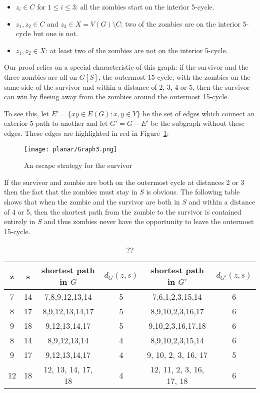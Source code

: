 \begin{itemize}
\item $z_i \in C$ for $1 \leq i \leq 3$: all the zombies start on the interior 5-cycle.
\item $z_1, z_2 \in C$ and $z_3 \in X = V(G) \setminus C$: two of the zombies are on the interior 5-cycle but one is not.
\item $z_1, z_2 \in X$: at least two of the zombies are not on the interior 5-cycle.
\end{itemize}

Our proof relies on a special characteristic of this graph: if the survivor and the three zombies are all on $G[S]$, the outermost 15-cycle,  with
the zombies on the same side of the survivor and within a distance of 2, 3, 4 or 5, then the survivor can win by fleeing away from the zombies around the outermost 15-cycle.

To see this, let $E' = \{xy \in E(G) : x, y \in Y\}$ be the set of edges which connect an exterior 5-path to another and let $G' = G - E'$ be the subgraph without these edges.
These edges are highlighted in red in Figure~\ref{fig:planarG3}:

\begin{figure}
\centering
\texttt{[image: planar/Graph3.png]}
\caption{An escape strategy for the survivor\label{fig:planarG3}}
\end{figure}

If the survivor and zombie are both on the outermost cycle at distances 2 or 3 then
the fact that the zombies must stay in $S$ is obvious.
The following table shows that when the zombie and the survivor are both in $S$ and within a distance of 4 or 5, then the shortest path from the zombie to the survivor is contained entirely in $S$ and thus zombies never have the opportunity to leave the outermost 15-cycle.

\begin{table}
\centering
\begin{tabular}{c | c | c | c | c | c}
z & s & shortest path in $G$ & $d_{G}(z,s)$ & shortest path in $G'$ & $d_{G'}(z,s)$  \\
\hline
7 & 14 & 7,8,9,12,13,14 & 5 & 7,6,1,2,3,15,14 & 6 \\
8 & 17 & 8,9,12,13,14,17 & 5 & 8,9,10,2,3,16,17 & 6 \\
9 & 18 & 9,12,13,14,17 & 5 & 9,10,2,3,16,17,18 & 6 \\
\hline
8 & 14 & 8,9,12,13,14 & 4 & 8,9,10,2,3,15,14 & 6 \\
9 & 17 & 9,12,13,14,17 & 4 & 9, 10, 2, 3, 16, 17 & 5 \\
12 & 18 & 12, 13, 14, 17, 18 & 4 & 12, 11, 2, 3, 16, 17, 18 & 6
\end{tabular}
\caption{?? \label{table outside}}
\end{table}

